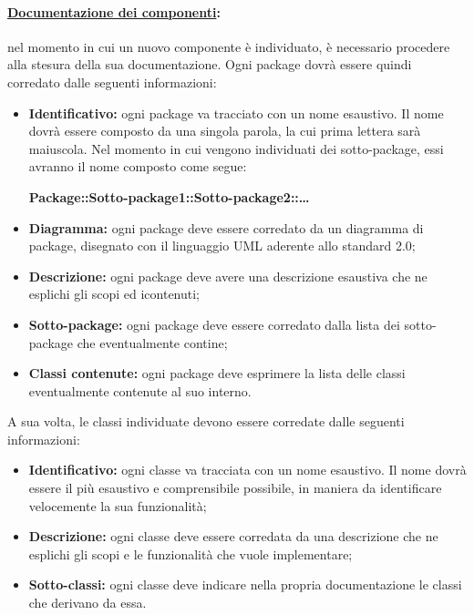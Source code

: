 \paragraph{\underline{Documentazione dei componenti}:} nel momento in cui un nuovo componente è individuato, è necessario procedere alla stesura della sua documentazione. Ogni package dovrà essere quindi corredato dalle seguenti informazioni:
\begin{itemize}
\item \textbf{Identificativo:} ogni package va tracciato con un nome esaustivo. Il nome dovrà essere composto da una singola parola, la cui prima lettera sarà maiuscola. Nel momento in cui vengono individuati dei sotto-package, essi avranno il nome composto come segue:
\begin{center}
\textbf{Package::Sotto-package1::Sotto-package2::\dots{}}
\end{center}
\item \textbf{Diagramma:} ogni package deve essere corredato da un diagramma di package, disegnato con il linguaggio UML\g{} aderente allo standard 2.0;
\item \textbf{Descrizione:} ogni package deve avere una descrizione esaustiva che ne esplichi gli scopi ed icontenuti;
\item \textbf{Sotto-package:} ogni package deve essere corredato dalla lista dei sotto-package che eventualmente contine;
\item \textbf{Classi contenute:} ogni package deve esprimere la lista delle classi eventualmente contenute al suo interno.
\end{itemize}
A sua volta, le classi individuate devono essere corredate dalle seguenti informazioni:
\begin{itemize}
\item \textbf{Identificativo:} ogni classe va tracciata con un nome esaustivo. Il nome dovrà essere il più esaustivo e comprensibile possibile, in maniera da identificare velocemente la sua funzionalità;
\item \textbf{Descrizione:} ogni classe deve essere corredata da una descrizione che ne esplichi gli scopi e le funzionalità che vuole implementare;
\item \textbf{Sotto-classi:} ogni classe deve indicare nella propria documentazione le classi che derivano da essa.
\end{itemize}

